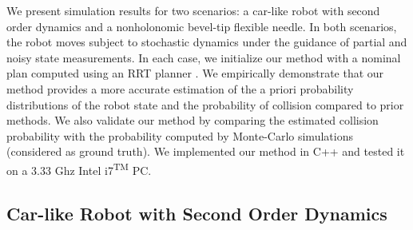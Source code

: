 
We present simulation results for two scenarios: a car-like robot with second order dynamics and a nonholonomic bevel-tip flexible needle. In both scenarios, the robot moves subject to stochastic dynamics under the guidance of partial and noisy state measurements. In each case, we initialize our method with a nominal plan computed using an RRT planner \cite{Book:Lavalle06}. We empirically demonstrate that our method provides a more accurate estimation of the a priori probability distributions of the robot state and the probability of collision compared to prior methods. We also validate our method by comparing the estimated collision probability with the probability computed by Monte-Carlo simulations (considered as ground truth). We implemented our method in C++ and tested it on a 3.33 Ghz Intel\textsuperscript{\tiny \textregistered} i7\textsuperscript{\tiny TM} PC.

\subsection{Car-like Robot with Second Order Dynamics}

